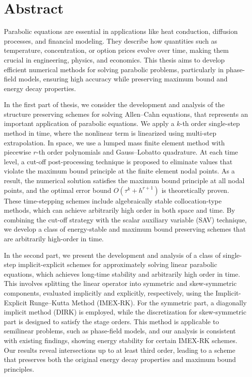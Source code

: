 \chapter*{Abstract}

\bigskip

Parabolic equations are essential in applications like heat conduction, diffusion processes, and financial modeling. They describe how quantities such as temperature, concentration, or option prices evolve over time, making them crucial in engineering, physics, and economics. This thesis aims to develop efficient numerical methods for solving parabolic problems, particularly in phase-field models, ensuring high accuracy while preserving maximum bound and energy decay properties.


In the first part of thesis, we consider the development and analysis of the structure preserving schemes for solving Allen--Cahn equations, that represents an important application of parabolic equations. We apply a $k$-th order single-step method in time, where the nonlinear term is linearized using multi-step extrapolation. In space, we use a lumped mass finite element method with piecewise $r$-th order polynomials and Gauss–Lobatto quadrature. At each time level, a cut-off post-processing technique is proposed to eliminate values that violate the maximum bound principle at the finite element nodal points. As a result, the numerical solution satisfies the maximum bound principle at all nodal points, and the optimal error bound $O(\tau^k + h^{r+1})$ is theoretically proven. These time-stepping schemes include algebraically stable collocation-type methods, which can achieve arbitrarily high order in both space and time. By combining the cut-off strategy with the scalar auxiliary variable (SAV) technique, we develop a class of energy-stable and maximum bound preserving schemes that are arbitrarily high-order in time.



In the second part, we present the development and analysis of a class of single-step implicit-explicit  schemes for approximately solving linear parabolic equations, which achieves long-time stability and arbitrarily high order in time. This involves splitting the linear operator into symmetric and skew-symmetric components, evaluated implicitly and explicitly, respectively, using the Implicit-Explicit Runge--Kutta Method (IMEX-RK). For the symmetric part, a diagonally implicit method (DIRK) is employed, while the discretization for skew-symmetric part is designed to satisfy the stage orders. This method is applicable to semilinear problems, such as phase-field models, and our analysis is consistent with existing findings, showing energy stability for certain IMEX-RK schemes. Our results reveal intersections up to at least third order, leading to a scheme that preserves both the original energy decay properties and maximum bound principles. 


